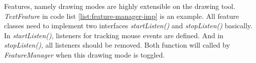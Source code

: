 Features, namely drawing modes are highly extensible on the drawing tool. \textit{TextFeature} in code list \ref{list:feature-manager-imp} is an example. All feature classes need to implement two interfaces \textit{startListen()} and \textit{stopListen()} basically. In \textit{startListen()}, listeners for tracking mouse events are defined. And in \textit{stopListen()}, all listeners should be removed. Both function will called by \textit{FeatureManager} when this drawing mode is toggled.